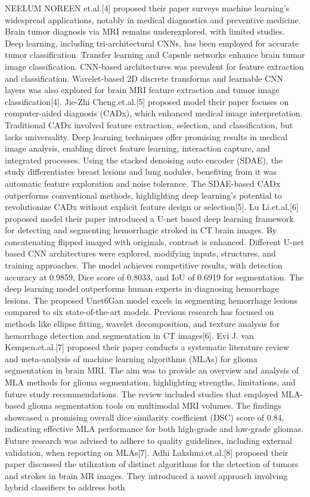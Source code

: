 NEELUM NOREEN et.al.[4] proposed their paper surveys machine learning's widespread applications, notably in medical diagnostics and preventive medicine. Brain tumor diagnosis via MRI remains underexplored, with limited studies. Deep learning, including tri-architectural CNNs, has been employed for accurate tumor classification. Transfer learning and Capsule networks enhance brain tumor image classification. CNN-based architectures was prevalent for feature extraction and classification. Wavelet-based 2D discrete transforms and learnable CNN layers was also explored for brain MRI feature extraction and tumor image classification[4]. Jie-Zhi Cheng.et.al.[5] proposed model their paper focuses on computer-aided diagnosis (CADx), which enhanced medical image interpretation. Traditional CADx involved feature extraction, selection, and classification, but lacks universality. Deep learning techniques offer promising results in medical image analysis, enabling direct feature learning, interaction capture, and integrated processes. Using the stacked denoising auto encoder (SDAE), the study differentiates breast lesions and lung nodules, benefiting from it was automatic feature exploration and noise tolerance. The SDAE-based CADx outperforms conventional methods, highlighting deep learning's potential to revolutionize CADx without explicit feature design or selection[5]. Lu Li.et.al.[6] proposed model their paper introduced a U-net based deep learning framework for detecting and segmenting hemorrhagic stroked in CT brain images. By concatenating flipped imaged with originals, contrast is enhanced. Different U-net based CNN architectures were explored, modifying inputs, structures, and training approaches. The model achieves competitive results, with detection accuracy at 0.9859, Dice score of 0.8033, and IoU of 0.6919 for segmentation. The deep learning model outperforms human experts in diagnosing hemorrhage lesions. The proposed Unet6Gan model excels in segmenting hemorrhage lesions compared to six state-of-the-art models. Previous research has focused on methods like ellipse fitting, wavelet decomposition, and texture analysis for hemorrhage detection and segmentation in CT images[6]. Evi J. van Kempen.et.al.[7] proposed their paper conducts a systematic literature review and meta-analysis of machine learning algorithms (MLAs) for glioma segmentation in brain MRI. The aim was to provide an overview and analysis of MLA methods for glioma segmentation, highlighting strengths, limitations, and future study recommendations. The review included studies that employed MLA-based glioma segmentation tools on multimodal MRI volumes. The findings showcased a promising overall dice similarity coefficient (DSC) score of 0.84, indicating effective MLA performance for both high-grade and low-grade gliomas. Future research was advised to adhere to quality guidelines, including external validation, when reporting on MLAs[7].\vspace{5mm} \newline Adhi Lakshmi.et.al.[8] proposed their paper discussed the utilization of distinct algorithms for the detection of tumors and strokes in brain MR images. They introduced a novel approach involving hybrid classifiers to address both 